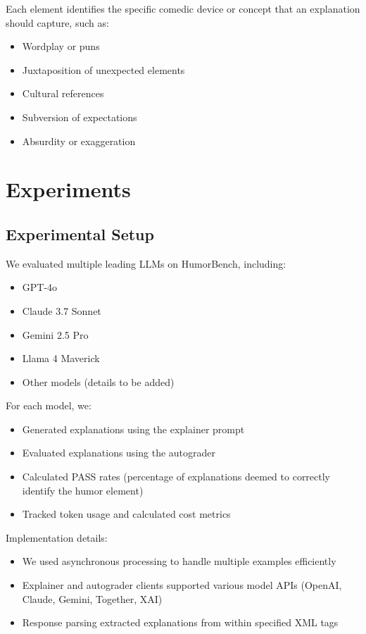 \documentclass[twocolumn]{article}
\begin{document}
Each element identifies the specific comedic device or concept that an explanation should capture, such as:
\begin{itemize}
    \item Wordplay or puns
    \item Juxtaposition of unexpected elements
    \item Cultural references
    \item Subversion of expectations
    \item Absurdity or exaggeration
\end{itemize}


\section{Experiments}

\subsection{Experimental Setup}

We evaluated multiple leading LLMs on HumorBench, including:
\begin{itemize}
    \item GPT-4o
    \item Claude 3.7 Sonnet
    \item Gemini 2.5 Pro
    \item Llama 4 Maverick
    \item Other models (details to be added)
\end{itemize}

For each model, we:
\begin{itemize}
    \item Generated explanations using the explainer prompt
    \item Evaluated explanations using the autograder
    \item Calculated PASS rates (percentage of explanations deemed to correctly identify the humor element)
    \item Tracked token usage and calculated cost metrics
\end{itemize}

Implementation details:
\begin{itemize}
    \item We used asynchronous processing to handle multiple examples efficiently
    \item Explainer and autograder clients supported various model APIs (OpenAI, Claude, Gemini, Together, XAI)
    \item Response parsing extracted explanations from within specified XML tags
\end{itemize}
\end{document}
